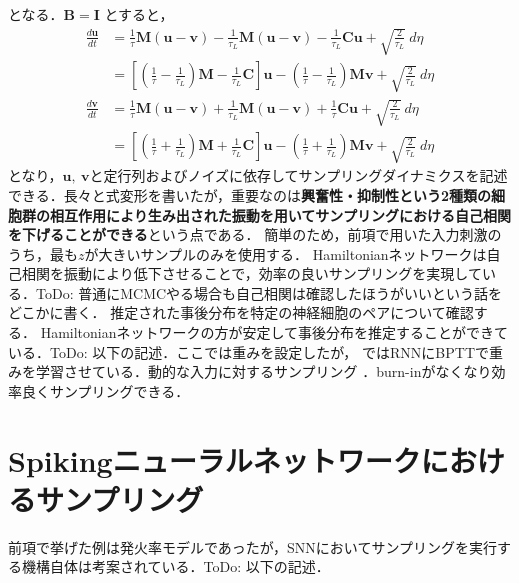 となる．$\mathbf{B = I}$ とすると，
\begin{align}
\frac{d\mathbf{u}}{dt} &= \frac{1}{\tau}\mathbf{M}\left( \mathbf{u} - \mathbf{v} \right) - \frac{1}{\tau_{L}}\mathbf{M}\left( \mathbf{u} - \mathbf{v} \right) - \frac{1}{\tau_{L}}\mathbf{Cu} + \sqrt{\frac{2}{\tau_{L}}}\ d\eta\\
&= \left\lbrack \left( \frac{1}{\tau} - \frac{1}{\tau_{L}} \right)\mathbf{M} - \frac{1}{\tau_{L}}\mathbf{C} \right\rbrack\mathbf{u} - \left( \frac{1}{\tau} - \frac{1}{\tau_{L}} \right)\mathbf{Mv} + \sqrt{\frac{2}{\tau_{L}}}\ d\eta\\
\frac{d\mathbf{v}}{dt} &= \frac{1}{\tau}\mathbf{M}\left( \mathbf{u} - \mathbf{v} \right) + \frac{1}{\tau_{L}}\mathbf{M}\left( \mathbf{u} - \mathbf{v} \right) + \frac{1}{\tau}\mathbf{Cu} + \sqrt{\frac{2}{\tau_{L}}}\ d\eta\\
&= \left\lbrack \left( \frac{1}{\tau} + \frac{1}{\tau_{L}} \right)\mathbf{M} + \frac{1}{\tau_{L}}\mathbf{C} \right\rbrack\mathbf{u} - \left( \frac{1}{\tau} + \frac{1}{\tau_{L}} \right)\mathbf{Mv} + \sqrt{\frac{2}{\tau_{L}}}\ d\eta
\end{align}
となり，$\mathbf{u}\mathbf{,\ v}$と定行列およびノイズに依存してサンプリングダイナミクスを記述できる．長々と式変形を書いたが，重要なのは\textbf{興奮性・抑制性という2種類の細胞群の相互作用により生み出された振動を用いてサンプリングにおける自己相関を下げることができる}という点である．
簡単のため，前項で用いた入力刺激のうち，最も$z$が大きいサンプルのみを使用する．
Hamiltonianネットワークは自己相関を振動により低下させることで，効率の良いサンプリングを実現している．ToDo: 普通にMCMCやる場合も自己相関は確認したほうがいいという話をどこかに書く．
推定された事後分布を特定の神経細胞のペアについて確認する．
Hamiltonianネットワークの方が安定して事後分布を推定することができている．ToDo: 以下の記述．ここでは重みを設定したが， \citep{Echeveste2020-sh}ではRNNにBPTTで重みを学習させている．動的な入力に対するサンプリング \citep{Berkes2011-xj}．burn-inがなくなり効率良くサンプリングできる．
\section{Spikingニューラルネットワークにおけるサンプリング}
前項で挙げた例は発火率モデルであったが，SNNにおいてサンプリングを実行する機構自体は考案されている．ToDo: 以下の記述．\citep{Buesing2011-dm}\citep{Masset2022-wh}\citep{Zhang2022-bl}
